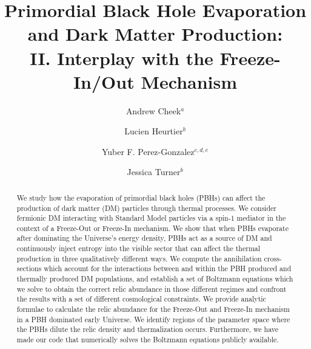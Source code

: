 \documentclass[aps,prd,reprint,twocolumn,preprintnumbers,floatfix,nofootinbib]{revtex4-1}
\begin{document}
\sloppy  




\vspace*{1mm}

\title{Primordial Black Hole Evaporation and Dark Matter Production:\\
II. Interplay with the Freeze-In/Out Mechanism}

\author{Andrew Cheek$^{a}$}
\author{Lucien Heurtier$^{b}$}
\author{Yuber F. Perez-Gonzalez$^{c, d, e}$}
\author{Jessica Turner$^{b}$}



\begin{abstract}

We study how the evaporation of primordial black holes (PBHs) can affect the production of dark matter (DM) particles through thermal processes. We consider fermionic DM interacting with Standard Model particles via a spin-1 mediator in the context of a Freeze-Out or Freeze-In mechanism. We show that when PBHs evaporate after dominating the Universe's energy density, PBHs act as a source of DM and continuously inject entropy into the visible sector that can affect the thermal production in three qualitatively different ways. We compute the annihilation cross-sections which account for the interactions between and within the PBH produced and thermally produced DM populations, and establish a set of Boltzmann equations which we solve to obtain the correct relic abundance in those different regimes and confront the results with a set of different cosmological constraints. We provide analytic formulae to calculate the relic abundance for the Freeze-Out and Freeze-In mechanism in a PBH dominated early Universe. We identify regions of the parameter space where the PBHs dilute the relic density and thermalization occurs. Furthermore, we have made our code that numerically solves the Boltzmann equations publicly available. \href{https://github.com/earlyuniverse/ulysses}{\faGithub}



\end{abstract}
\maketitle
\end{document}

